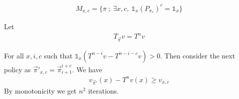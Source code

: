 \documentclass{article}
\def\1{{\mathds 1}}
\begin{document}
\begin{align}
M_{x,c} = \{ \pi ~;~ \exists x,c,~ \1_x (P_{\pi_*})^c=\1_x \}
\end{align}

Let
\begin{align}
  T_{\vec\pi}v = T^n v
\end{align}

For all $x,i,c$ such that $\1_x (T^{n-i}v - T^{n-i-c}v)>0$.
Then consider the next policy as $\vec\pi'_{x,c}=\vec\pi_{i+1}^{i+c}$.
We have
\begin{align}
  v_{\vec\pi'}(x)-T^nv(x) \ge v_{x,c}
\end{align}
By monotonicity we get $n^2$ iterations.
  


\end{document}
